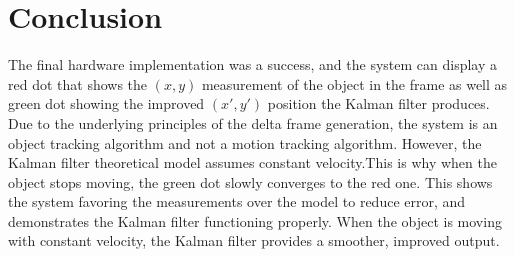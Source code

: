 \documentclass[11pt]{article} %
\begin{document}
\section{Conclusion}
The final hardware implementation was a success, and the system can display a red dot that shows the $(x,y)$ measurement of the object in the frame as well as green dot showing the improved $(x',y')$ position the Kalman filter produces. Due to the underlying principles of the delta frame generation, the system is an object tracking algorithm and not a motion tracking algorithm. However, the Kalman filter theoretical model assumes constant velocity.This is why when the object stops moving, the green dot slowly converges to the red one. This shows the system favoring the measurements over the model to reduce error, and demonstrates the Kalman filter functioning properly. When the object is moving with constant velocity, the Kalman filter provides a smoother, improved output.
\newpage
\end{document}
